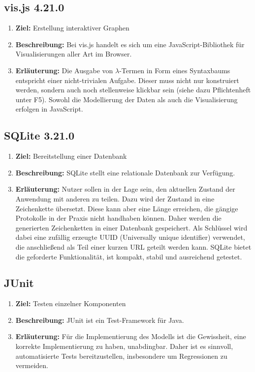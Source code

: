 \documentclass[parskip=full,11pt]{scrartcl}
\begin{document}
\subsection{vis.js 4.21.0}
\begin{enumerate}
\item[] \textbf{Ziel:} Erstellung interaktiver Graphen
\item[] \textbf{Beschreibung:} Bei vis.js handelt es sich um eine JavaScript-Bibliothek für Visualisierungen aller Art im Browser.
\item[] \textbf{Erläuterung:} Die Ausgabe von $\lambda$-Termen in Form eines Syntaxbaums entspricht einer nicht-trivialen Aufgabe.
Dieser muss nicht nur konstruiert werden, sondern auch noch stellenweise klickbar sein (siehe dazu Pflichtenheft unter F5).
Sowohl die Modellierung der Daten als auch die Visualisierung erfolgen in JavaScript.
\end{enumerate}

\subsection{SQLite 3.21.0}
\begin{enumerate}
\item[] \textbf{Ziel:} Bereitstellung einer Datenbank
\item[] \textbf{Beschreibung:} SQLite stellt eine relationale Datenbank zur Verfügung.
\item[] \textbf{Erläuterung:} Nutzer sollen in der Lage sein, den aktuellen Zustand der Anwendung mit anderen zu teilen.
Dazu wird der Zustand in eine Zeichenkette übersetzt.
Diese kann aber eine Länge erreichen, die gängige Protokolle in der Praxis nicht handhaben können.
Daher werden die generierten Zeichenketten in einer Datenbank gespeichert.
Als Schlüssel wird dabei eine zufällig erzeugte UUID (Universally unique identifier) verwendet, die anschließend als Teil einer
kurzen URL geteilt werden kann.
SQLite bietet die geforderte Funktionalität, ist kompakt, stabil und ausreichend getestet.
\end{enumerate}

\subsection{JUnit}
\begin{enumerate}
\item[] \textbf{Ziel:} Testen einzelner Komponenten
\item[] \textbf{Beschreibung:} JUnit ist ein Test-Framework für Java.
\item[] \textbf{Erläuterung:} Für die Implementierung des Modells ist die Gewissheit, eine korrekte Implementierung zu haben, unabdingbar.
Daher ist es sinnvoll, automatisierte Tests bereitzustellen, insbesondere um Regressionen zu vermeiden.
\end{enumerate}
\end{document}
